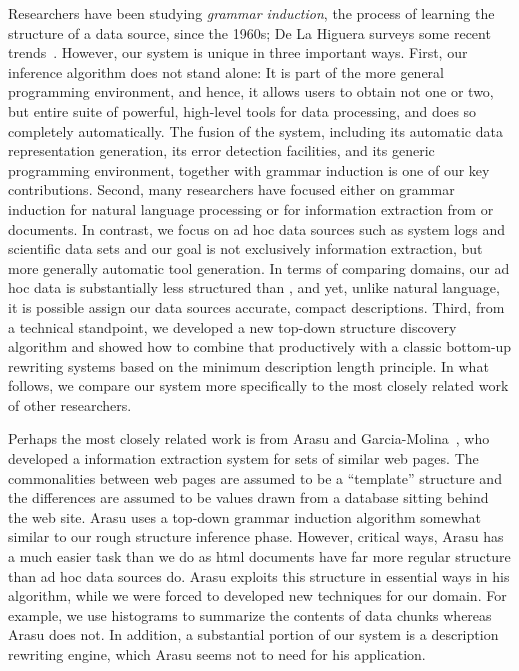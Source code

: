 Researchers have been studying {\em grammar induction}, the process of
learning the structure of a data source, since the 1960s; De La Higuera
surveys some recent trends~\cite{higuera01current}.  However,
our system is unique in three important ways.  First, our inference
algorithm does not stand alone: It is part of the more general \pads{}
programming environment, and hence, it allows
users to obtain not one or two, but entire suite of
powerful, high-level tools for data processing, and does so completely 
automatically.  The fusion of the
\pads{} system, including its automatic data representation generation,
its error detection facilities, and its generic programming environment, 
together with grammar induction
is one of our key contributions.  Second, many researchers have
focused either on grammar induction for natural language processing or
for information extraction from \xml{} or \html{} documents.  In
contrast, we focus on ad hoc data sources such as system logs and
scientific data sets and our goal is not exclusively information extraction,
but more generally automatic tool generation.  In terms of comparing domains,
our ad hoc data is substantially less
structured than \xml{}, and yet, unlike natural language, it is
possible assign our data sources accurate, compact descriptions.  Third, from a
technical standpoint, we developed a new top-down structure discovery
algorithm and showed how to combine that productively with a
classic bottom-up rewriting systems based on the minimum description
length principle.  In what follows, we compare our system more
specifically to the most closely related work of other researchers.

Perhaps the most closely related work is from Arasu and 
Garcia-Molina~\cite{arasu+:sigmod03}, who developed a information
extraction system for sets of similar web pages.  The
commonalities between web pages are assumed to be a ``template'' structure
and the differences are assumed to be values drawn from a database
sitting behind the web site.  Arasu uses a top-down grammar induction
algorithm somewhat similar to our rough structure inference phase.  
However, critical ways, Arasu has a much easier task than we do as html
documents have far more regular structure than ad hoc data sources do.
Arasu exploits this structure in essential ways in his algorithm,
while we were forced to developed new techniques for our domain.  For example,
we use histograms to summarize the contents of data chunks whereas
Arasu does not.  In addition, a substantial portion of our system
is a description rewriting engine, which Arasu seems not to need for
his application.  

